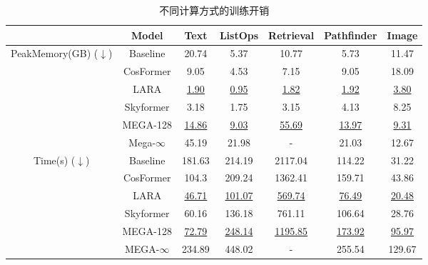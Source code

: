 \begin{table}[htbp]
  \centering

  \caption{不同计算方式的训练开销}
    \begin{tabular}{c|c|ccccc}
    \hline
          & Model & Text  & ListOps & Retrieval & Pathfinder & Image \bigstrut\\
    \hline
    \multicolumn{1}{c|}{\multirow{6}[4]{*}{Peak\newline{}Memory(GB) ($\downarrow$)}} & Baseline & 20.74  & 5.37  & 10.77  & 5.73  & 11.47  \bigstrut[t]\\
          & CosFormer & 9.05  & 4.53  & 7.15  & 9.05  & 18.09  \\
          & LARA  & \underline{1.90} & \underline{0.95} & \underline{1.82} & \underline{1.92} & \underline{3.80} \\
          & Skyformer & 3.18  & 1.75  & 3.15  & 4.13  & 8.25  \bigstrut[b]\\
\cline{2-7}          & MEGA-128 & \underline{14.86} & \underline{9.03} & \underline{55.69} & \underline{13.97} & \underline{9.31} \bigstrut[t]\\
          & Mega-$\infty$ & 45.19  & 21.98  & -     & 21.03  & 12.67  \bigstrut[b]\\
    \hline
    \multirow{6}[4]{*}{Time(s) ($\downarrow$)} & Baseline & 181.63 & 214.19 & 2117.04 & 114.22 & 31.22 \bigstrut[t]\\
          & CosFormer & 104.3 & 209.24 & 1362.41 & 159.71 & 43.86 \\
          & LARA  & \underline{46.71} & \underline{101.07} & \underline{569.74} & \underline{76.49} & \underline{20.48} \\
          & Skyformer & 60.16 & 136.18 & 761.11 & 106.64 & 28.76 \bigstrut[b]\\
\cline{2-7}          & MEGA-128 & \underline{72.79} & \underline{248.14} & \underline{1195.85} & \underline{173.92} & \underline{95.97} \bigstrut[t]\\
          & MEGA-$\infty$ & 234.89  & 448.02  & -     & 255.54  & 129.67  \bigstrut[b]\\
    \hline
    \end{tabular}%
   \label{tab:training}
\end{table}%
